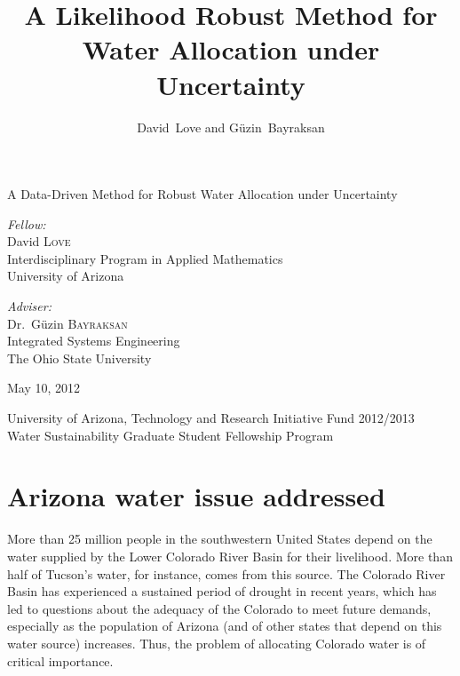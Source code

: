 \documentclass[12pt]{amsart}
\author{David~Love and G\"{u}zin~Bayraksan}
\title{A Likelihood Robust Method for Water Allocation under Uncertainty}
\date{}
\begin{document}
\begin{titlepage}
\begin{center}

\vspace*{4cm}

{ \huge A Data-Driven Method for Robust Water Allocation under Uncertainty}\\[0.4cm]

\vspace{3cm}

\begin{minipage}{0.45\textwidth}
\begin{flushleft} \large
\emph{Fellow:}\\
 David \textsc{Love}\\
 Interdisciplinary Program in Applied Mathematics\\
 University of Arizona
\end{flushleft}
\end{minipage}
\begin{minipage}{0.45\textwidth}
\begin{flushright} \large
\emph{Adviser:} \\
 Dr.~G\"{u}zin \textsc{Bayraksan}\\
 Integrated Systems Engineering\\
 The Ohio State University
\end{flushright}
\end{minipage}

\vspace{2cm}

{\large May 10, 2012}

\vspace{2cm}

{\large University of Arizona, Technology and Research Initiative Fund 2012/2013\\Water Sustainability Graduate Student Fellowship Program}

\end{center}
\end{titlepage}

\section{Arizona water issue addressed}

More than 25 million people in the southwestern United States depend on the water supplied by the Lower Colorado River Basin for their livelihood.
More than half of Tucson's water, for instance, comes from this source.
The Colorado River Basin has experienced a sustained period of drought in recent years, which has led to questions about the adequacy of the Colorado to meet future demands, especially as the population of Arizona (and of other states that depend on this water source) increases.
Thus, the problem of allocating Colorado water is of critical importance. 
 
\end{document}

